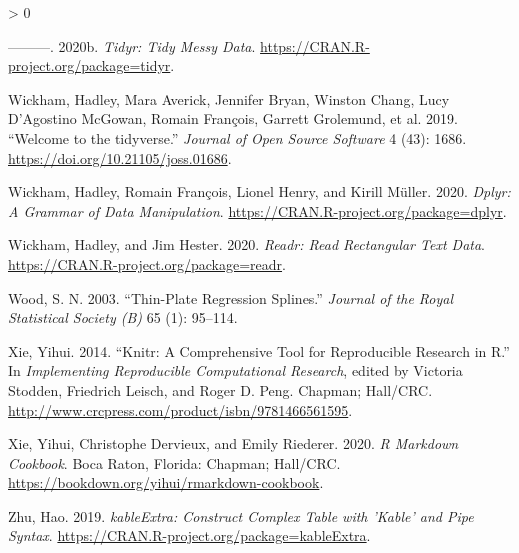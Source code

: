\documentclass{article}
\newlength{\cslhangindent}
\newenvironment{CSLReferences}[2] %
 {%
  \setlength{\parindent}{0pt}
  \ifodd #1 \everypar{\setlength{\hangindent}{\cslhangindent}}\ignorespaces\fi
  \ifnum #2 > 0
  \setlength{\parskip}{#2\baselineskip}
  \fi
 }%
 {}
\begin{document}
\begin{CSLReferences}{1}{0}
\leavevmode\hypertarget{ref-tidyr}{}%
---------. 2020b. \emph{Tidyr: Tidy Messy Data}. \url{https://CRAN.R-project.org/package=tidyr}.

\leavevmode\hypertarget{ref-tidyverse}{}%
Wickham, Hadley, Mara Averick, Jennifer Bryan, Winston Chang, Lucy D'Agostino McGowan, Romain François, Garrett Grolemund, et al. 2019. {``Welcome to the {tidyverse}.''} \emph{Journal of Open Source Software} 4 (43): 1686. \url{https://doi.org/10.21105/joss.01686}.

\leavevmode\hypertarget{ref-dplyr}{}%
Wickham, Hadley, Romain François, Lionel Henry, and Kirill Müller. 2020. \emph{Dplyr: A Grammar of Data Manipulation}. \url{https://CRAN.R-project.org/package=dplyr}.

\leavevmode\hypertarget{ref-readr}{}%
Wickham, Hadley, and Jim Hester. 2020. \emph{Readr: Read Rectangular Text Data}. \url{https://CRAN.R-project.org/package=readr}.

\leavevmode\hypertarget{ref-mgcv}{}%
Wood, S. N. 2003. {``Thin-Plate Regression Splines.''} \emph{Journal of the Royal Statistical Society (B)} 65 (1): 95--114.

\leavevmode\hypertarget{ref-knitr}{}%
Xie, Yihui. 2014. {``Knitr: A Comprehensive Tool for Reproducible Research in {R}.''} In \emph{Implementing Reproducible Computational Research}, edited by Victoria Stodden, Friedrich Leisch, and Roger D. Peng. Chapman; Hall/CRC. \url{http://www.crcpress.com/product/isbn/9781466561595}.

\leavevmode\hypertarget{ref-rmarkdown}{}%
Xie, Yihui, Christophe Dervieux, and Emily Riederer. 2020. \emph{R Markdown Cookbook}. Boca Raton, Florida: Chapman; Hall/CRC. \url{https://bookdown.org/yihui/rmarkdown-cookbook}.

\leavevmode\hypertarget{ref-kableExtra}{}%
Zhu, Hao. 2019. \emph{kableExtra: Construct Complex Table with 'Kable' and Pipe Syntax}. \url{https://CRAN.R-project.org/package=kableExtra}.

\end{CSLReferences}



\end{document}
